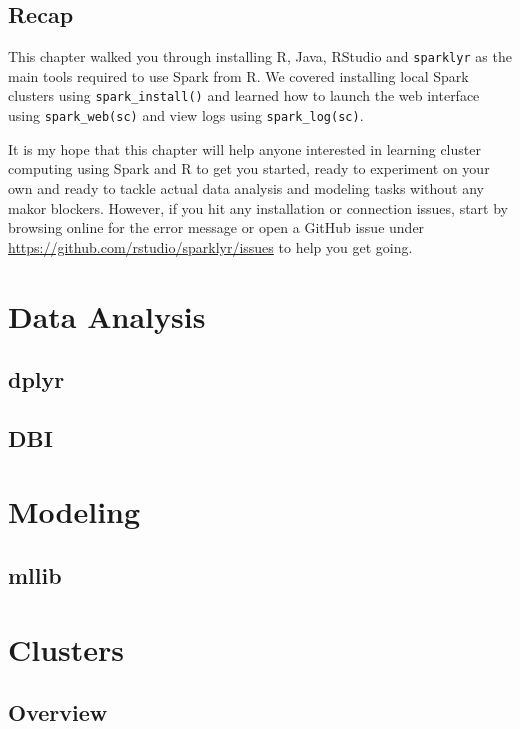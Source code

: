 \documentclass[]{book}
\theoremstyle{definition}
\theoremstyle{definition}
\theoremstyle{definition}
\theoremstyle{remark}
\begin{document}
\section{Recap}\label{recap}

This chapter walked you through installing R, Java, RStudio and
\texttt{sparklyr} as the main tools required to use Spark from R. We
covered installing local Spark clusters using \texttt{spark\_install()}
and learned how to launch the web interface using
\texttt{spark\_web(sc)} and view logs using \texttt{spark\_log(sc)}.

It is my hope that this chapter will help anyone interested in learning
cluster computing using Spark and R to get you started, ready to
experiment on your own and ready to tackle actual data analysis and
modeling tasks without any makor blockers. However, if you hit any
installation or connection issues, start by browsing online for the
error message or open a GitHub issue under
\url{https://github.com/rstudio/sparklyr/issues} to help you get going.

\chapter{Data Analysis}\label{dplyr}

\section{dplyr}\label{dplyr}

\section{DBI}\label{dbi}

\chapter{Modeling}\label{modeling}

\section{mllib}\label{mllib}

\chapter{Clusters}\label{clusters}

\section{Overview}\label{overview}
\end{document}
